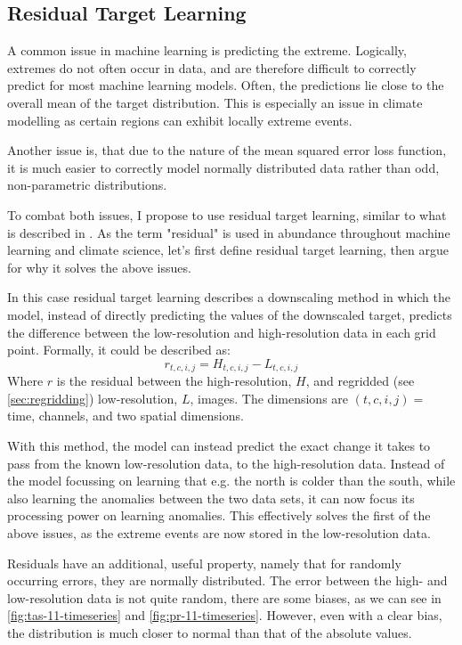 \subsection{Residual Target Learning}

A common issue in machine learning is predicting the extreme. Logically, extremes do not often occur in data, and are therefore difficult to correctly predict for most machine learning models. Often, the predictions lie close to the overall mean of the target distribution. This is especially an issue in climate modelling as certain regions can exhibit locally extreme events. 

Another issue is, that due to the nature of the mean squared error loss function, it is much easier to correctly model normally distributed data rather than odd, non-parametric distributions.

To combat both issues, I propose to use residual target learning, similar to what is described in \cite{tomasi}. As the term "residual" is used in abundance throughout machine learning and climate science, let's first define residual target learning, then argue for why it solves the above issues.

In this case residual target learning describes a \gls{downscaling} method in which the model, instead of directly predicting the values of the downscaled target, predicts the difference between the low-resolution and high-resolution data in each grid point. Formally, it could be described as:
\begin{equation} \label{eq:residuals}
    r_{t,c,i,j} = H_{t,c,i,j} - L_{t,c,i,j}
\end{equation}
Where $r$ is the residual between the high-resolution, $H$, and regridded (see \autoref{sec:regridding}) low-resolution, $L$, images. The dimensions are $(t,c,i,j)=$ time, channels, and two spatial dimensions.

With this method, the model can instead predict the exact change it takes to pass from the known low-resolution data, to the high-resolution data. Instead of the model focussing on learning that e.g. the north is colder than the south, while also learning the anomalies between the two data sets, it can now focus its processing power on learning anomalies. This effectively solves the first of the above issues, as the extreme events are now stored in the low-resolution data.

Residuals have an additional, useful property, namely that for randomly occurring errors, they are normally distributed. The error between the high- and low-resolution data is not quite random, there are some biases, as we can see in \autoref{fig:tas-11-timeseries} and \autoref{fig:pr-11-timeseries}. However, even with a clear bias, the distribution is much closer to normal than that of the absolute values.

